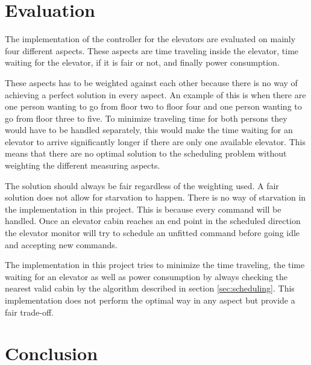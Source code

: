 \documentclass[10pt,a4paper]{article}
\begin{document}
\section{Evaluation}
\label{sec:eval}
The implementation of the controller for the elevators are evaluated on mainly four different aspects. These aspects are time traveling inside the elevator, time waiting for the elevator, if it is fair or not, and finally power consumption.

These aspects has to be weighted against each other because there is no way of achieving a perfect solution in every aspect. An example of this is when there are one person wanting to go from floor two to floor four and one person wanting to go from floor three to five. To minimize traveling time for both persons they would have to be handled separately, this would make the time waiting for an elevator to arrive significantly longer if there are only one available elevator. This means that there are no optimal solution to the scheduling problem without weighting the different measuring aspects.

The solution should always be fair regardless of the weighting used. A fair solution does not allow for starvation to happen. There is no way of starvation in the implementation in this project. This is because every command will be handled. Once an elevator cabin reaches an end point in the scheduled direction the elevator monitor will try to schedule an unfitted command before going idle and accepting new commands.

The implementation in this project tries to minimize the time traveling, the time waiting for an elevator as well as power consumption by always checking the nearest valid cabin by the algorithm described in section \ref{sec:scheduling}. This implementation does not perform the optimal way in any aspect but provide a fair trade-off.

\section{Conclusion}
\label{sec:conclusion}
\end{document}
